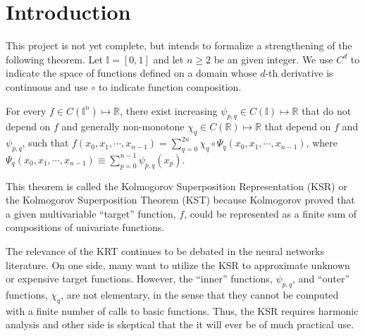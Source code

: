 %

\chapter{Introduction}

This project is not yet complete, but intends to formalize a strengthening of the following theorem. Let $\mathbb{I} = \left[0,1\right]$ and let $n \geq 2$ be an given integer. We use $C^d$ to indicate the space of functions defined on a domain whose $d$-th derivative is continuous and use $\circ$ to indicate function composition.

\begin{theorem*}[Kolmogorov 1957]
  \label{thm:KST}
  For every $f \in C\left(\mathbb{I}^n\right) \mapsto \mathbb{R}$, there exist increasing $\psi_{p,q} \in C\left(\mathbb{I}\right) \mapsto \mathbb{R}$ that do not depend on $f$ and generally non-monotone $\chi_q \in C\left(\mathbb{R}\right) \mapsto \mathbb{R}$ that depend on $f$ and $\psi_{p,q}$, such that $f\left(x_0, x_1, \cdots, x_{n - 1}\right) = \sum\limits_{q = 0}^{2n} \chi_q \circ \Psi_q\left(x_0, x_1, \cdots, x_{n - 1}\right)$, where $\Psi_q\left(x_0, x_1, \cdots, x_{n - 1}\right) \equiv \sum\limits_{p = 0}^{n - 1} \psi_{p,q}\left(x_p\right)$.
\end{theorem*}

\noindent This theorem is called the Kolmogorov Superposition Representation (KSR) or the Kolmogorov Superposition Theorem (KST) because Kolmogorov proved that a given multivariable ``target'' function, $f$, could be represented as a finite sum of compositions of univariate functions. 

The relevance of the KRT continues to be debated in the neural networks literature. On one side, many want to utilize the KSR to approximate unknown or expensive target functions. However, the ``inner'' functions, $\psi_{p,q}$, and ``outer'' functions, $\chi_q$, are not elementary, in the sense that they cannot be computed with a finite number of calls to basic functions. Thus, the KSR requires harmonic analysis and other side is skeptical that the it will ever be of much practical use.

